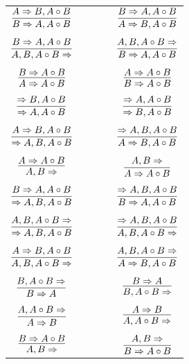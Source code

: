 \documentclass[11pt]{article}
\begin{document}
\begin{center}
\begin{tabular}{ccc}
$\infer{B\Rightarrow A, A\circ B}{A\Rightarrow B, A\circ B}$	& \ \ \ \ & $\infer{A\Rightarrow B, A\circ B}{B\Rightarrow A, A\circ B}$ \\
	&& \\
$\infer{A, B, A\circ B\Rightarrow }{B\Rightarrow A, A\circ B}$	&& $\infer{B\Rightarrow A, A\circ B}{A, B, A\circ B\Rightarrow }$ \\
	&& \\
$\infer{A\Rightarrow A\circ B}{B\Rightarrow A\circ B}$	&& $\infer{B\Rightarrow A\circ B}{A\Rightarrow A\circ B}$ \\
	&& \\
$\infer{\Rightarrow A, A\circ B}{\Rightarrow B, A\circ B}$	&& $\infer{\Rightarrow B, A\circ B}{\Rightarrow A, A\circ B}$ \\
	&& \\
$\infer{\Rightarrow A, B, A\circ B}{A\Rightarrow B, A\circ B}$	&& $\infer{A\Rightarrow B, A\circ B}{\Rightarrow A, B, A\circ B}$ \\
	&& \\
$\infer{A, B\Rightarrow }{A\Rightarrow A\circ B}$	&& $\infer{A\Rightarrow A\circ B}{A, B\Rightarrow }$ \\
	&& \\
$\infer{\Rightarrow A, B, A\circ B}{B\Rightarrow A, A\circ B}$	&& $\infer{B\Rightarrow A, A\circ B}{\Rightarrow A, B, A\circ B}$ \\
	&& \\
$\infer{\Rightarrow A, B, A\circ B}{A, B, A\circ B\Rightarrow }$	&& $\infer{A, B, A\circ B\Rightarrow }{\Rightarrow A, B, A\circ B}$ \\
	&& \\
$\infer{A, B, A\circ B\Rightarrow }{A\Rightarrow B, A\circ B}$	&& $\infer{A\Rightarrow B, A\circ B}{A, B, A\circ B\Rightarrow }$ \\
	&& \\
$\infer{B\Rightarrow A}{B, A\circ B\Rightarrow }$	&& $\infer{B, A\circ B\Rightarrow }{B\Rightarrow A}$ \\
	&& \\
$\infer{A\Rightarrow B}{A, A\circ B\Rightarrow }$	&& $\infer{A, A\circ B\Rightarrow }{A\Rightarrow B}$ \\
	&& \\
$\infer{A, B\Rightarrow }{B\Rightarrow A\circ B}$	&&  $\infer{B\Rightarrow A\circ B}{A, B\Rightarrow }$
\end{tabular}



\end{center}
\end{document}
